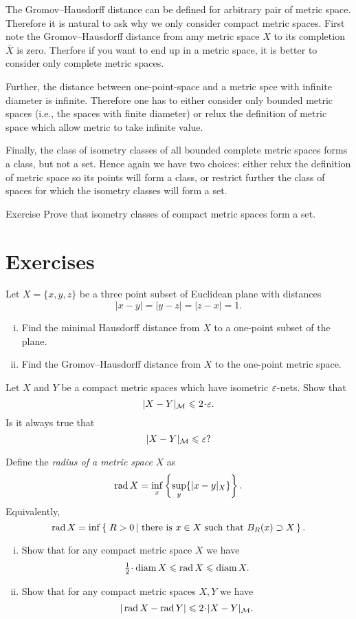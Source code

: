 The Gromov--Hausdorff distance can be defined for arbitrary pair of metric space.
Therefore it is natural to ask why we only consider compact metric spaces.
First note the Gromov--Hausdorff distance from amy metric space $X$ 
to its completion $\bar X$ is zero.
Therfore if you want to end up in a metric space, it is better to consider only complete metric spaces.

Further, the distance between one-point-space and a metric spce with infinite diameter is infinite.
Therefore one has to either consider only bounded metric spaces (i.e., the spaces with finite diameter)
or relux the definition of metric space which allow metric to take infinite value.

Finally, the class of isometry classes of all bounded complete metric spaces forms a class, but not a set.
Hence again we have two choices: either relux the definition of metric space so its points will form a class, or restrict further the class of spaces for which the isometry classes will form a set.

\begin{thm}{Exercise}
Prove that isometry classes of compact metric spaces form a set. 
\end{thm}


\section*{Exercises}

\begin{pr}\label{pr:GH1}
Let $X=\{x,y,z\}$ be a three point subset of Euclidean plane with distances
$$|x-y|=|y-z|=|z-x|=1.$$
\begin{enumerate}[(i)]
\item Find the minimal Hausdorff distance from $X$ to a one-point subset of the plane.
\item Find the Gromov--Hausdorff distance from $X$ to the one-point metric space. 
\end{enumerate}
\end{pr}

\begin{pr}\label{pr:GH2}
Let $X$ and $Y$ be a compact metric spaces which have isometric $\varepsilon$-nets.
Show that 
$$|X-Y|_{\mathcal{M}}\le 2\cdot\eps.$$
Is it always true that 
$$|X-Y|_{\mathcal{M}}\leqslant \varepsilon?$$
\end{pr}




\begin{pr}\label{pr:GH3}
Define the \emph{radius of a metric space} $X$ as 
$$\mathop{\rm rad} X=\inf_x\left\{\sup_y\{|x-y|_X\}\right\}.$$
Equivalently, 
$$\rad X=\inf\set{R>0}{\text{there is}\ x\in X\  \text{such that}\ B_R(x)\supset X}.$$
 
\begin{enumerate}[(i)]
\item Show that for any compact metric space $X$ we have
$$\tfrac12\cdot\diam X\le \rad X\le \diam X.$$
\item Show that for any compact metric spaces $X,Y$ we have
$$|\rad X-\rad Y|\le 2\cdot |X-Y|_{\mathcal{M}}.$$
\end{enumerate}
\end{pr}

